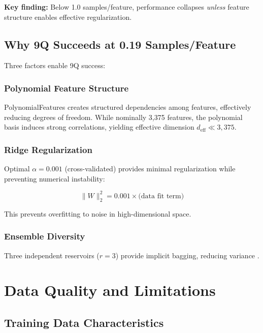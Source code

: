 \documentclass[conference]{IEEEtran}
\begin{document}
\textbf{Key finding:} Below 1.0 samples/feature, performance collapses \textit{unless} feature structure enables effective regularization.

\subsection{Why 9Q Succeeds at 0.19 Samples/Feature}

Three factors enable 9Q success:

\subsubsection{Polynomial Feature Structure}

PolynomialFeatures creates structured dependencies among features, effectively reducing degrees of freedom. While nominally 3,375 features, the polynomial basis induces strong correlations, yielding effective dimension $d_{\text{eff}} \ll 3,375$.

\subsubsection{Ridge Regularization}

Optimal $\alpha=0.001$ (cross-validated) provides minimal regularization while preventing numerical instability:

\begin{equation}
\|W\|_2^2 = 0.001 \times \text{(data fit term)}
\label{eq:ridge_penalty}
\end{equation}

This prevents overfitting to noise in high-dimensional space.

\subsubsection{Ensemble Diversity}

Three independent reservoirs ($r=3$) provide implicit bagging, reducing variance \cite{goodfellow2016deep}.

\section{Data Quality and Limitations}
\label{sec:limitations}

\subsection{Training Data Characteristics}
\end{document}
